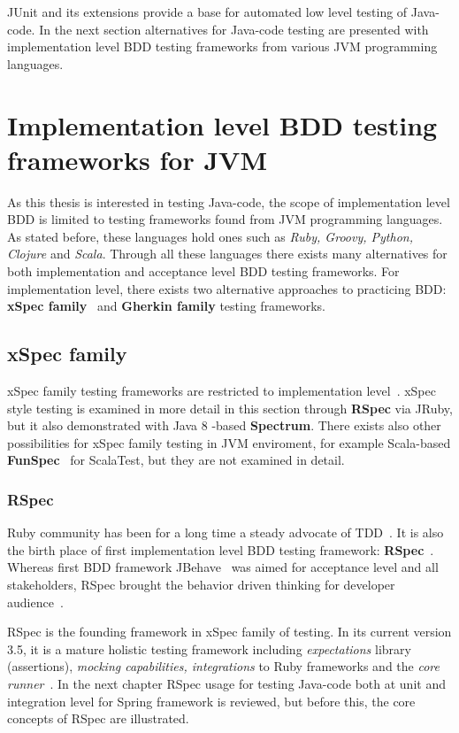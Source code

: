     JUnit and its extensions provide a base for automated low level testing of Java-code.
    In the next section alternatives for Java-code testing are presented with implementation level BDD testing frameworks from
    various JVM programming languages.

\section{Implementation level BDD testing frameworks for JVM}
    As this thesis is interested in testing Java-code, the scope of implementation level BDD is limited to testing frameworks
    found from JVM programming languages. As stated before, these languages hold ones such as \textit{Ruby, Groovy, Python,
    Clojure} and \textit{Scala}. Through all these languages there exists many alternatives for both implementation and
    acceptance level BDD testing frameworks. For implementation level, there exists two alternative approaches to practicing
    BDD: \textbf{xSpec family}~\cite{solis2011study} and \textbf{Gherkin family} testing frameworks.

    \subsection{xSpec family}
    xSpec family testing frameworks are restricted to implementation level~\cite{solis2011study}. xSpec style testing
    is examined in more detail in this section through \textbf{RSpec} via JRuby, but it also demonstrated with
    Java 8 -based \textbf{Spectrum}. There exists also other possibilities for xSpec family testing in JVM enviroment,
    for example Scala-based \textbf{FunSpec}~\cite{funspec} for ScalaTest, but they are not examined in detail.
    \subsubsection{RSpec}
    Ruby community has been for a long time a steady advocate of TDD~\cite{lerner2009forge}. It is also the birth place
    of first implementation level BDD testing framework: \textbf{RSpec}~\cite{astels2006new}. Whereas first BDD framework
    JBehave~\cite{bdd2006north} was aimed for acceptance level and all stakeholders, RSpec brought the behavior driven thinking for developer
    audience~\cite{astels2006new}.

    RSpec is the founding framework in xSpec family of testing. In its current version 3.5, it is a mature holistic testing
    framework including \textit{expectations} library (assertions), \textit{mocking capabilities, integrations} to Ruby frameworks and the \textit{core runner}~\cite{rspecdoc}.
    In the next chapter RSpec usage for testing Java-code both at unit and integration level for Spring framework is reviewed,
    but before this, the core concepts of RSpec are illustrated.

